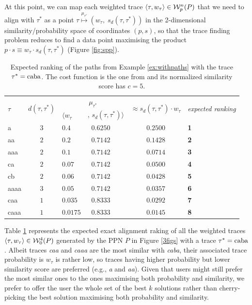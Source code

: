 At this point, we can map each weighted trace  $\braket{\tau,w_\tau}\in\mathcal{W}_p^n(P)$ that we need to align with $\tau^*$ as a point $\tau\overset{\mu_{\tau^*}}{\mapsto}(w_\tau,\; s_d(\tau,\tau^*))$ in the 2-dimensional similarity/probability space of coordinates $(p,s)$, so that the trace finding problem reduces to find a data point maximising the product $p\cdot s\equiv w_\tau\cdot s_d(\tau,\tau^*)$ (Figure \ref{fig:spp}).

\begin{table}[!t]
\centering
\caption{Expected ranking of the paths from Example \ref{ex:withpaths} with the trace $\tau^*=\textup{caba}$. The cost function is the one from \cite{LeoniM17} and its normalized similarity score has $c=5$.}\label{tab:expected}
\begin{tabular}{lc|ll|cl}
	\toprule
	
	\multirow{2}{*}{$\tau$} & 
	\multirow{2}{*}{$d(\tau,\tau^*)$} & 
	\multicolumn{2}{c|}{$\mu_{\tau^*}$} &
	 \multirow{2}{*}{$\approx s_d(\tau,\tau^*)\cdot w_\tau$} & \multirow{2}{*}{\textit{expected ranking}}\\
	 
	\cline{3-4} &&  $\langle w_\tau$ &  $,\,s_d(\tau,\tau^*)\rangle $ &&\\
	 
	\midrule
	{a}  & $3$ & $0.4$ & $\;\; 0.6250$  & $0.2500$ & \textbf{1}\\
	{aa}  & $2$ & $0.2$ & $\;\; 0.7142$ & $0.1428$ & \textbf{2}\\
	{aaa}  & $2$ & $0.1$ & $\;\; 0.7142$ & $0.0714$ & \textbf{3}\\
	{ca}  & $2$ & $0.07$ & $\;\; 0.7142$ & $0.0500$ & \textbf{4}\\
	{cb}  & $2$ & $0.06$ & $\;\; 0.7142$ & $0.0428$ & \textbf{5}\\
	{aaaa}  & $3$ & $0.05$ & $\;\; 0.7142$ & $0.0357$ & \textbf{6}\\
	{caa}  & $1$ & $0.035$ & $\;\; 0.8333$ & $0.0292$ &  \textbf{7}\\
	{caaa}  & $1$  & $0.0175$ & $\;\; 0.8333$ & $0.0145$ & \textbf{8}\\
	\bottomrule
\end{tabular}
\end{table}
\begin{example}\label{ex:rankingTaus}
Table \ref{tab:expected} represents the expected exact alignment raking of all the weighted traces $\braket{\tau,w_\tau}\in\mathcal{W}_0^4(P)$ generated by the PPN $P$ in Figure \ref{3figs} with a trace $\tau^*=\textup{caba}$.  Albeit traces \textit{caa} and \textit{caaa} are the most similar with \textit{caba}, their associated trace probability is $w_\tau$ is rather low, so traces having higher probability but lower similarity score are preferred (e.g., \textit{a} and \textit{aa}). Given that users might still prefer the most similar ones to the ones maximising both probability and similarity, we prefer to offer the user the whole set of the best $k$ solutions rather than cherry-picking the best solution maximising both probability and similarity.
\end{example}

